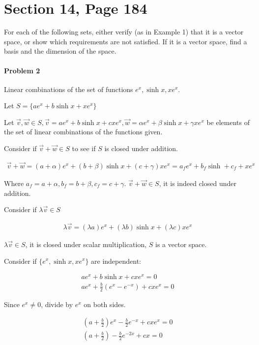 \documentclass{article}
\begin{document}
\section*{Section 14, Page 184}

For each of the following sets, either verify (as in Example 1) that it is a vector space,
or show which requirements are not satisfied. If it is a vector space, find a basis and the
dimension of the space.

\paragraph{Problem 2}
Linear combinations of the set of functions ${e^x, \sinh x, xe^x}$.

Let $S = \{ ae^x + b\sinh x + xe^x\}$

Let $\vec{v}, \vec{w} \in S, \vec{v} = a e^x + b \sinh x + c xe^x, \vec{w} = \alpha e^x + \beta \sinh x + \gamma xe^x$ be elements of the set of linear combinations of the functions given. 

Consider if $\vec{v} + \vec{w} \in S$ to see if $S$ is closed under addition.

\begin{align*}
\vec{v} + \vec{w} = (a+\alpha) e^x + (b + \beta) \sinh x + (c + \gamma) xe^x = a_f e^x + b_f \sinh + c_f + xe^x
\end{align*}

Where $a_f = a + \alpha, b_f = b+\beta, c_f = c + \gamma$. $\vec{v} + \vec{w} \in S$, it is indeed closed under addition.

Consider if $\lambda \vec{v} \in S$

\begin{align*}
\lambda \vec{v} = (\lambda a)e^x + (\lambda b) \sinh x + (\lambda c) xe^x
\end{align*}

$\lambda \vec{v} \in S$, it is closed under scalar multiplication, $S$ is a vector space.

Consider if $\{e^x, \sinh x, xe^x\}$ are independent:

\begin{align*}
ae^x + b \sinh x + c xe^x = 0 \\
a e^x + \frac{b}{2} (e^x - e^{-x}) + c xe^x = 0
\end{align*}

Since $e^x \neq 0$, divide by $e^x$ on both sides.

\begin{align*}
(a + \frac{b}{2}) e^x - \frac{b}{2} e^{-x} + c xe^x = 0 \\
(a + \frac{b}{2}) - \frac{b}{2} e^{-2x} + cx = 0
\end{align*}
\end{document}
